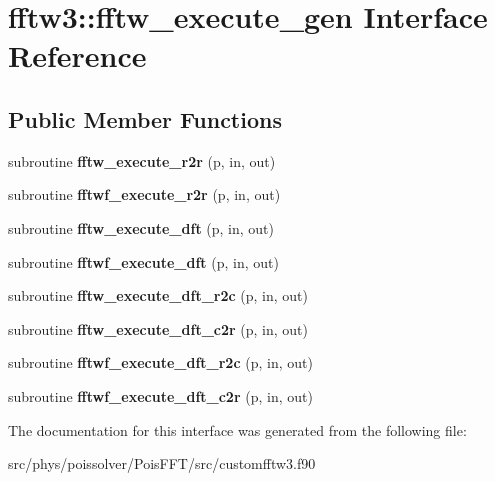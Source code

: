 \hypertarget{interfacefftw3_1_1fftw__execute__gen}{}\section{fftw3\+:\+:fftw\+\_\+execute\+\_\+gen Interface Reference}
\label{interfacefftw3_1_1fftw__execute__gen}
\subsection*{Public Member Functions}
\begin{DoxyCompactItemize}
\item 
subroutine {\bfseries fftw\+\_\+execute\+\_\+r2r} (p, in, out)\hypertarget{interfacefftw3_1_1fftw__execute__gen_a0121f9cf07fde92d9fd3034abfd731d9}{}\label{interfacefftw3_1_1fftw__execute__gen_a0121f9cf07fde92d9fd3034abfd731d9}

\item 
subroutine {\bfseries fftwf\+\_\+execute\+\_\+r2r} (p, in, out)\hypertarget{interfacefftw3_1_1fftw__execute__gen_a617de0197b6311557671506dec4a0925}{}\label{interfacefftw3_1_1fftw__execute__gen_a617de0197b6311557671506dec4a0925}

\item 
subroutine {\bfseries fftw\+\_\+execute\+\_\+dft} (p, in, out)\hypertarget{interfacefftw3_1_1fftw__execute__gen_a4e7ac6576c650222054dbae3c9f05392}{}\label{interfacefftw3_1_1fftw__execute__gen_a4e7ac6576c650222054dbae3c9f05392}

\item 
subroutine {\bfseries fftwf\+\_\+execute\+\_\+dft} (p, in, out)\hypertarget{interfacefftw3_1_1fftw__execute__gen_a0efbc820ddddd35d3f050137e20f3a18}{}\label{interfacefftw3_1_1fftw__execute__gen_a0efbc820ddddd35d3f050137e20f3a18}

\item 
subroutine {\bfseries fftw\+\_\+execute\+\_\+dft\+\_\+r2c} (p, in, out)\hypertarget{interfacefftw3_1_1fftw__execute__gen_a03c4dddfc10f0cb0e9482391de17ecbe}{}\label{interfacefftw3_1_1fftw__execute__gen_a03c4dddfc10f0cb0e9482391de17ecbe}

\item 
subroutine {\bfseries fftw\+\_\+execute\+\_\+dft\+\_\+c2r} (p, in, out)\hypertarget{interfacefftw3_1_1fftw__execute__gen_a892333e1a85d1efd2f70ec4088274b4d}{}\label{interfacefftw3_1_1fftw__execute__gen_a892333e1a85d1efd2f70ec4088274b4d}

\item 
subroutine {\bfseries fftwf\+\_\+execute\+\_\+dft\+\_\+r2c} (p, in, out)\hypertarget{interfacefftw3_1_1fftw__execute__gen_aa1250ed5339653fe4041490ede34e880}{}\label{interfacefftw3_1_1fftw__execute__gen_aa1250ed5339653fe4041490ede34e880}

\item 
subroutine {\bfseries fftwf\+\_\+execute\+\_\+dft\+\_\+c2r} (p, in, out)\hypertarget{interfacefftw3_1_1fftw__execute__gen_a955cbe74d9571a7758ab60460336b146}{}\label{interfacefftw3_1_1fftw__execute__gen_a955cbe74d9571a7758ab60460336b146}

\end{DoxyCompactItemize}


The documentation for this interface was generated from the following file\+:\begin{DoxyCompactItemize}
\item 
src/phys/poissolver/\+Pois\+F\+F\+T/src/customfftw3.\+f90\end{DoxyCompactItemize}
